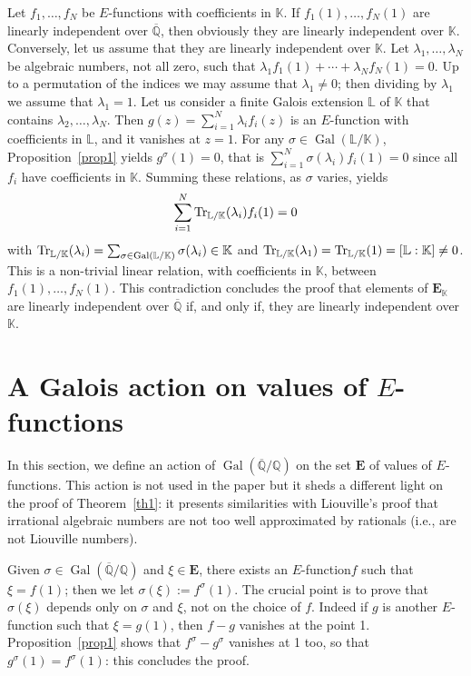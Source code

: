\documentclass[JEP,XML,SOM,Unicode,published]{cedram}
\newcommand{\Efunction}{$E$\nobreakdash-func\-tion\xspace}
\newcommand{\Efunctions}{$E$\nobreakdash-func\-tions\xspace}
\theoremstyle{definition}
\newcommand{\Q}{\mathbb{Q}}
\newcommand{\K}{\mathbb{K}}
\renewcommand{\L}{\mathbb{L}}
\newcommand{\EE}{{\mathbf E}}
\newcommand{\Qbar}{\overline{\mathbb Q}}
\newcommand{\EK}{\EE_{\K}}
\DeclareMathOperator{\Gal}{Gal}
\begin{document}
Let $f_1,\ldots,f_N$ be \Efunctions with coefficients in $\K$. If $f_1(1),\ldots,f_N(1)$ are linearly independent over $\Qbar$, then obviously they are linearly independent over $\K$. Conversely, let us assume that they are linearly independent over $\K$. Let $\lambda_1,\ldots,\lambda_N$ be algebraic numbers, not all zero, such that $ \lambda_1 f_1(1) + \cdots + \lambda_N f_N(1)=0$. Up to a permutation of the indices we may assume that $\lambda_1\neq 0$; then dividing by $\lambda_1$ we assume that $\lambda_1=1$. Let us consider a finite Galois extension $\L$ of $\K$ that contains
$\lambda_2,\ldots,\lambda_N$. Then $g(z) = \sum_{i=1}^N \lambda_i f_i(z)$ is an \Efunction with coefficients in $\L$, and it vanishes at $z=1$. For any $\sigma\in\Gal(\L/\K)$, Proposition~\ref{prop1} yields $g^\sigma(1)=0$, that is $\sum_{i=1}^N \sigma(\lambda_i) f_i(1)=0$ since all $f_i$ have coefficients in $\K$. Summing these relations, as $\sigma$ varies, yields\vspace*{-3pt}
\[
\sum_{i=1}^N {\rm Tr}_{\L/\K} (\lambda_i) f_i(1)=0
\]
with $ {\rm Tr}_{\L/\K} (\lambda_i) = \sum_{\sigma\in\Gal(\L/\K)} \sigma(\lambda_i) \in \K$ and $ {\rm Tr}_{\L/\K} (\lambda_1 ) = {\rm Tr}_{\L/\K} (1) = [\L:\K]\neq 0$. This is a non-trivial linear relation, with coefficients in $\K$, between $f_1(1),\ldots,f_N(1)$. This contradiction concludes the proof that elements of $\EK$ are linearly independent over $\Qbar$ if, and only if, they are linearly independent over $\K$.

\section{A Galois action on values of \texorpdfstring{\protect\Efunctions}{Ef}} \label{secGalois}

In this section, we define an action of $\Gal(\Qbar/\Q)$ on the set $\EE$ of values of \Efunctions.
This action is not used in the paper but it sheds a different light on the proof of Theorem~\ref{th1}: it presents similarities with Liouville's proof that irrational algebraic numbers are not too well approximated by rationals (i.e., are not Liouville numbers).

Given $\sigma\in \Gal(\Qbar/\Q)$ and $\xi\in\EE$, there exists an \Efunction $f$ such that $\xi=f(1)$; then we let $\sigma(\xi) := f^\sigma(1)$. The crucial point is to prove that $\sigma(\xi) $ depends only on $\sigma $ and $\xi$, not on the choice of $f$. Indeed if $g$ is another \Efunction such that $\xi=g(1)$, then $f-g$ vanishes at the point 1. Proposition~\ref{prop1} shows that $f^\sigma-g^\sigma$ vanishes at 1 too, so that $ g^\sigma(1)= f^\sigma(1)$: this concludes the proof.
\end{document}
